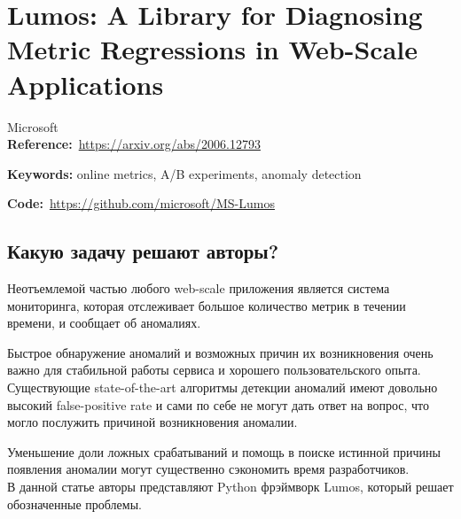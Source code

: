 \chapter{Lumos: A Library for Diagnosing Metric Regressions in Web-Scale Applications}

Microsoft \\

\textbf{Reference:}~\url{https://arxiv.org/abs/2006.12793}

\textbf{Keywords:} online metrics, A/B experiments, anomaly detection

\textbf{Code:}~\url{https://github.com/microsoft/MS-Lumos}

\section*{Какую задачу решают авторы?}

Неотъемлемой частью любого web-scale приложения является система мониторинга, которая отслеживает большое количество метрик в течении времени, и сообщает об аномалиях.

Быстрое обнаружение аномалий и возможных причин их возникновения очень важно для стабильной работы сервиса и хорошего пользовательского опыта. \\

Существующие state-of-the-art алгоритмы детекции аномалий имеют довольно высокий false-positive rate и сами по себе не могут дать ответ на вопрос, что могло послужить причиной возникновения аномалии.

Уменьшение доли ложных срабатываний и помощь в поиске истинной причины появления аномалии могут существенно сэкономить время разработчиков. \\

В данной статье авторы представляют Python фрэймворк Lumos, который решает обозначенные проблемы.



